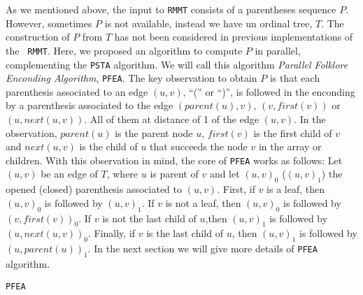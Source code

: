 As we mentioned above, the input to {\tt RMMT} consists of a
parentheses sequence $P$. However, sometimes $P$ is not available,
instead we have un ordinal tree, $T$. The construction of $P$ from $T$
has not been considered in previous implementations of the {\tt
  RMMT}. Here, we proposed an algorithm to compute $P$ in parallel,
complementing the {\tt PSTA} algorithm. We will call this algorithm
\emph{Parallel Folklore Enconding Algorithm}, {\tt PFEA}. The key
observation to obtain $P$ is that each parenthesis associated to an
edge $(u,v)$, ``('' or ``)'', is followed in the enconding by a
parenthesis associated to the edge $(parent(u), v)$, $(v, first(v))$
or $(u, next(u,v))$. All of them at distance of 1 of the edge
$(u,v)$. In the observation, $parent(u)$ is the parent node $u$,
$first(v)$ is the first child of $v$ and $next(u,v)$ is the child of
$u$ that succeeds the node $v$ in the array or children. With this
observation in mind, the core of {\tt PFEA} works as follows: Let
$(u,v)$ be an edge of $T$, where $u$ is parent of $v$ and let
$(u,v)_{0}$ ($(u,v)_{1}$) the opened (closed) parenthesis associated
to $(u,v)$. First, if $v$ is a leaf, then $(u,v)_{0}$ is followed by
$(u,v)_{1}$. If $v$ is not a leaf, then $(u,v)_{0}$ is followed by
$(v,first(v))_{0}$. If $v$ is not the last child of $u$,then
$(u,v)_{1}$ is followed by $(u,next(u,v))_{0}$. Finally, if $v$ is the
last child of $u$, then $(u,v)_{1}$ is followed by
$(u,parent(u))_{1}$. In the next section we will give more details of
{\tt PFEA} algorithm.

\begin{algorithm}[t]
\small
\SetVlineSkip{-2cm}
  \LinesNumbered
  \SetAlgoNoEnd
  \DontPrintSemicolon
  \BlankLine%

  \caption{{\tt PFEA}}
  \label{algo:PFEA}
\end{algorithm}
\normalsize

